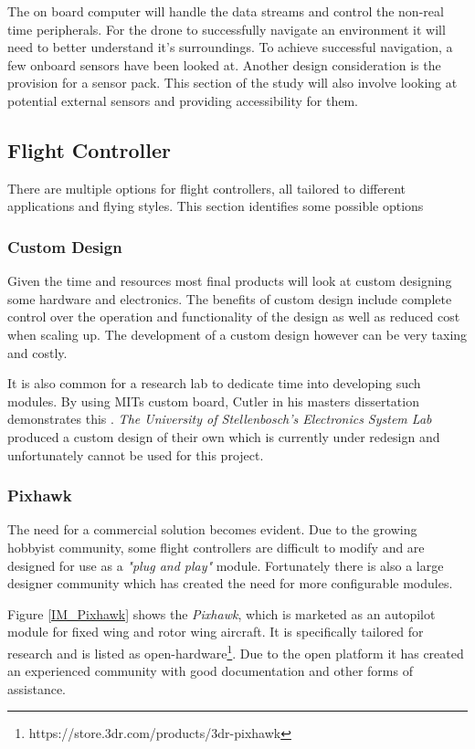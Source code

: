 	The on board computer will handle the data streams and control the non-real time peripherals. For the drone to successfully navigate an environment it will need to better understand it's surroundings. To achieve successful navigation, a few onboard sensors have been looked at. Another design consideration is the provision for a sensor pack. This section of the study will also involve looking at potential external sensors and providing accessibility for them.
	
		\subsection{Flight Controller}
		There are multiple options for flight controllers, all tailored to different applications and flying styles. This section identifies some possible options
		
			\subsubsection{Custom Design}
			Given the time and resources most final products will look at custom designing some hardware and electronics. The benefits of custom design include complete control over the operation and functionality of the design as well as reduced cost when scaling up. The development of a custom design however can be very taxing and costly.
			
			It is also common for a research lab to dedicate time into developing such modules. By using MITs custom board, Cutler in his masters dissertation demonstrates this \cite{How2012}. \textit{The University of Stellenbosch's Electronics System Lab} produced a custom design  of their own which is currently under redesign and unfortunately cannot be used for this project.
		
			\subsubsection{Pixhawk}
			The need for a commercial solution becomes evident. Due to the growing hobbyist community, some flight controllers are difficult to modify and are designed for use as a \textit{"plug and play"} module. Fortunately there is also a large designer community which has created the need for more configurable modules.
			
			Figure \ref{IM_Pixhawk} shows the \textit{Pixhawk}, which is marketed as an autopilot module for fixed wing and rotor wing aircraft. It is specifically tailored for research and is listed as open-hardware\footnote{https://store.3dr.com/products/3dr-pixhawk}. Due to the open platform it has created an experienced community with good documentation and other forms of assistance.
			
